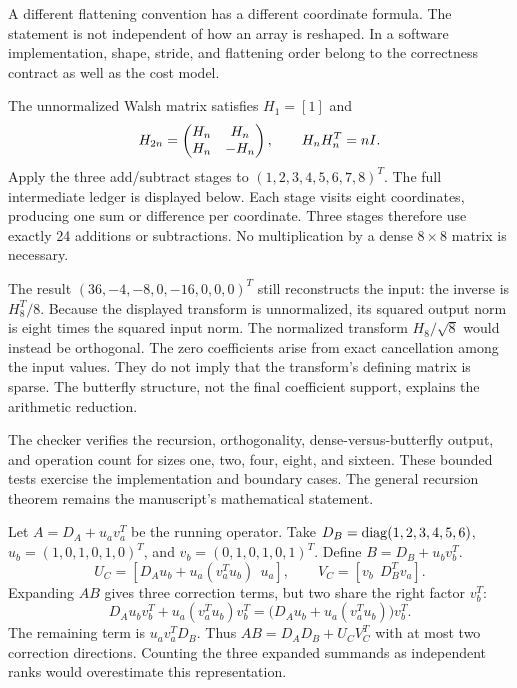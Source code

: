 A different flattening convention has a different coordinate formula. The statement is not independent of how an array is reshaped. In a software implementation, shape, stride, and flattening order belong to the correctness contract as well as the cost model.

The unnormalized Walsh matrix satisfies $H_1=[1]$ and
\[
H_{2n}=\begin{pmatrix}H_n&H_n\\H_n&-H_n\end{pmatrix},\qquad H_nH_n^T=nI.
\]
Apply the three add/subtract stages to $(1,2,3,4,5,6,7,8)^T$. The full intermediate ledger is displayed below.
Each stage visits eight coordinates, producing one sum or difference per coordinate. Three stages therefore use exactly 24 additions or subtractions. No multiplication by a dense $8\times8$ matrix is necessary.

The result $(36,-4,-8,0,-16,0,0,0)^T$ still reconstructs the input: the inverse is $H_8^T/8$. Because the displayed transform is unnormalized, its squared output norm is eight times the squared input norm. The normalized transform $H_8/\sqrt8$ would instead be orthogonal.
The zero coefficients arise from exact cancellation among the input values. They do not imply that the transform's defining matrix is sparse. The butterfly structure, not the final coefficient support, explains the arithmetic reduction.

The checker verifies the recursion, orthogonality, dense-versus-butterfly output, and operation count for sizes one, two, four, eight, and sixteen. These bounded tests exercise the implementation and boundary cases. The general recursion theorem remains the manuscript's mathematical statement.

Let $A=D_A+u_av_a^T$ be the running operator. Take $D_B=\operatorname{diag}(1,2,3,4,5,6)$, $u_b=(1,0,1,0,1,0)^T$, and $v_b=(0,1,0,1,0,1)^T$. Define $B=D_B+u_bv_b^T$.
\[
U_C=[D_Au_b+u_a(v_a^Tu_b)\ \ u_a],\qquad
V_C=[v_b\ \ D_B^Tv_a].
\]
Expanding $AB$ gives three correction terms, but two share the right factor $v_b^T$:
\[
D_Au_bv_b^T+u_a(v_a^Tu_b)v_b^T
=\bigl(D_Au_b+u_a(v_a^Tu_b)\bigr)v_b^T.
\]
The remaining term is $u_av_a^TD_B$. Thus $AB=D_AD_B+U_CV_C^T$ with at most two correction directions. Counting the three expanded summands as independent ranks would overestimate this representation.

